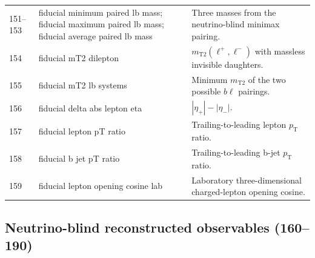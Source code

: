 \documentclass[10pt,a4paper]{article}
\newcommand{\pt}{p_{\mathrm T}}
\newcommand{\lplus}{\ell^+}
\newcommand{\lminus}{\ell^-}
\newcommand{\hist}[1]{\textsf{#1}}
\begin{document}
\begin{longtable}{L{1.1cm}L{6.25cm}L{8.45cm}}
151--153 & \hist{fiducial minimum paired lb mass}; \hist{fiducial maximum paired lb mass}; \hist{fiducial average paired lb mass} & Three masses from the neutrino-blind minimax pairing.\\
154 & \hist{fiducial mT2 dilepton} & \(m_{\mathrm T2}(\lplus,\lminus)\) with massless invisible daughters.\\
155 & \hist{fiducial mT2 lb systems} & Minimum \(m_{\mathrm T2}\) of the two possible \(b\ell\) pairings.\\
156 & \hist{fiducial delta abs lepton eta} & \(|\eta_+|-|\eta_-|\).\\
157 & \hist{fiducial lepton pT ratio} & Trailing-to-leading lepton \(\pt\) ratio.\\
158 & \hist{fiducial b jet pT ratio} & Trailing-to-leading b-jet \(\pt\) ratio.\\
159 & \hist{fiducial lepton opening cosine lab} & Laboratory three-dimensional charged-lepton opening cosine.\\
\bottomrule
\end{longtable}

\subsection{Neutrino-blind reconstructed observables (160--190)}
\end{document}
